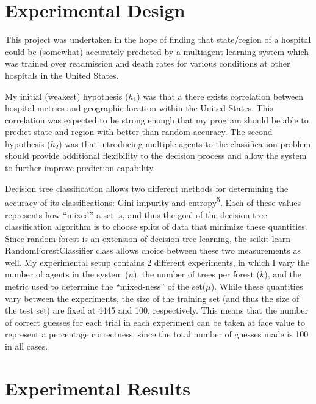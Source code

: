 \documentclass{article}
\begin{document}
 \section{Experimental Design}

\par This project was undertaken in the hope of finding that state/region of a hospital could be (somewhat) accurately predicted by a multiagent learning system which was trained over readmission and death rates for various conditions at other hospitals in the United States. 

\par My initial (weakest) hypothesis ($h_{1}$) was that a there exists correlation between hospital metrics and geographic location within the United States. This correlation was expected to be strong enough that my program should be able to predict state and region with better-than-random accuracy. The second hypothesis ($h_{2}$) was that introducing multiple agents to the classification problem should provide additional flexibility to the decision process and allow the system to further improve prediction capability.

\par Decision tree classification allows two different methods for determining the accuracy of its classifications: Gini impurity and entropy\textsuperscript{5}. Each of these values represents how ``mixed'' a set is, and thus the goal of the decision tree classification algorithm is to choose splits of data that minimize these quantities. Since random forest is an extension of decision tree learning, the scikit-learn RandomForestClassifier class allows choice between these two measurements as well. My experimental setup contains 2 different experiments, in which I vary the number of agents in the system ($n$), the number of trees per forest ($k$), and the metric used to determine the ``mixed-ness'' of the set($\mu$). While these quantities vary between the experiments, the size of the training set (and thus the size of the test set) are fixed at 4445 and 100, respectively. This means that the number of correct guesses for each trial in each experiment can be taken at face value to represent a percentage correctness, since the total number of guesses made is 100 in all cases.

\section{Experimental Results}
\end{document}
